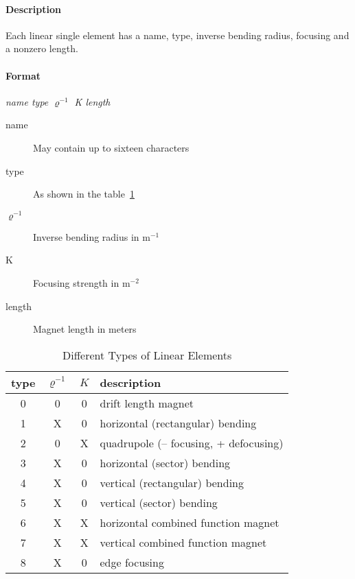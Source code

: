 \documentclass[a4paper,11pt]{report}
\begin{document}
\paragraph{Description}
Each linear single element has a name, type, inverse bending radius,
focusing and a nonzero length.

\paragraph{Format} {\em name type $ \varrho^{-1} $ K length}

\begin{description}
\item [name] May contain up to sixteen characters
\item [type] As shown in the table~\ref{T-LinEle}
\item [$ \varrho^{-1}$] Inverse bending radius in $\mathrm{m}^{-1}$
\item [K] Focusing strength in $\mathrm{m}^{-2}$
\item [length] Magnet length in meters
\end{description}

\begin{table}[h]
\caption{Different Types of Linear Elements}
\label{T-LinEle}
\scriptsize \centering
\begin{tabular}{|c|c|c|l|}
  \hline
  type & $ \varrho^{-1} $ & $K$ & description \\
  \hline
  0 & 0 & 0 & drift length magnet \\
  1 & X & 0 & horizontal (rectangular) bending \\
  2 & 0 & X & quadrupole (-- focusing, + defocusing) \\
  3 & X & 0 & horizontal (sector) bending \\
  4 & X & 0 & vertical (rectangular) bending \\
  5 & X & 0 & vertical (sector) bending \\
  6 & X & X & horizontal combined function magnet \\
  7 & X & X & vertical combined function magnet \\
  8 & X & 0 & edge focusing \\
  \hline
\end{tabular}
\normalsize
\end{table}
\end{document}

